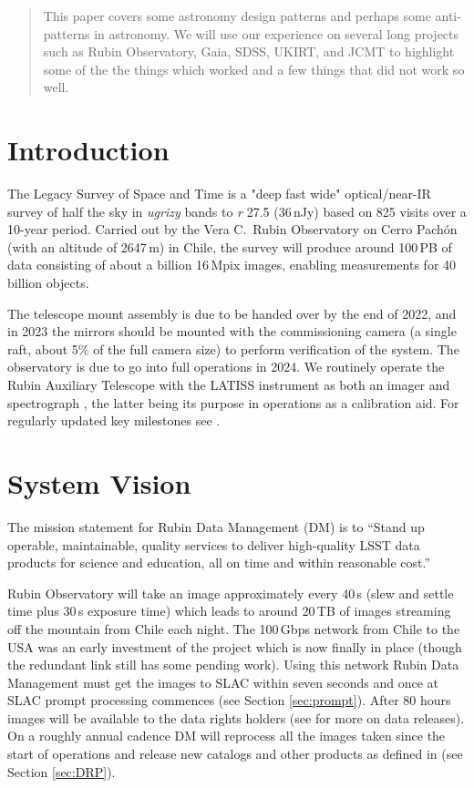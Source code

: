\documentclass[11pt,twoside]{article}
\begin{document}
\begin{abstract}
This paper covers some astronomy design patterns and perhaps some anti-patterns in astronomy. We will use our experience on several long projects such as Rubin Observatory, Gaia, SDSS,  UKIRT, and JCMT to highlight some of the the things which worked and a few things that did not work so well.
\end{abstract}

\section{Introduction}

The Legacy Survey of Space and Time \citep{2019ApJ...873..111I} is a "deep fast wide" optical/near-IR survey of half the sky in \emph{ugrizy} bands to \emph{r} 27.5 (36\,nJy) based on 825 visits over a 10-year period.
Carried out by the Vera C.\ Rubin Observatory on Cerro Pach\'{o}n (with an altitude of 2647\,m) in Chile, the survey will produce around 100\,PB of data consisting of about a billion 16\,Mpix images, enabling measurements for 40 billion objects.

The telescope mount assembly is due to be handed over by the end of 2022, and in 2023 the mirrors should be mounted with the commissioning camera (a single raft, about 5\% of the full camera size) to perform verification of the system.
The observatory is due to go into full operations in 2024.
We routinely operate the Rubin Auxiliary Telescope with the LATISS instrument as both an imager and spectrograph \citep{2020SPIE11452E..0UI}, the latter being its purpose in operations as a calibration aid.
For regularly updated key milestones see \citet{DMTN-232}.

\section{System Vision}
The mission statement for Rubin Data Management (DM) is to ``Stand up operable, maintainable, quality services to deliver high-quality LSST data products for science and education, all on time and within reasonable cost.''

Rubin Observatory will take an image approximately every 40\,s (slew and settle time plus 30\,s exposure time) which leads to around 20\,TB of images streaming off the mountain from Chile each night.
The 100\,Gbps network from Chile to the USA was an early investment of the project which is now finally in place (though the redundant link still has some pending work).
Using this network Rubin Data Management must get the images to SLAC within seven seconds and once at SLAC prompt processing commences (see Section \ref{sec:prompt}).
After 80 hours images will be available to the data rights holders (see \citet{RDO-011} for more on data releases).
On a roughly annual cadence DM will reprocess all the images taken since the start of operations and release new catalogs and other products as defined in \citet{LSE-163} (see Section \ref{sec:DRP}).
\end{document}
